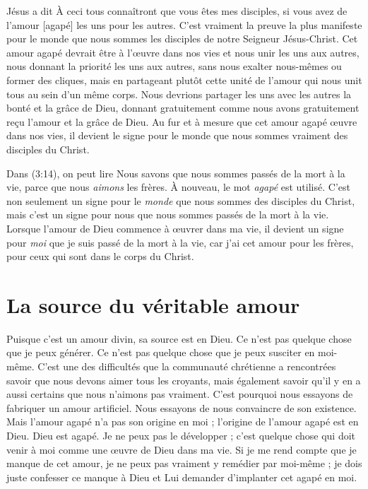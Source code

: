 Jésus a dit\frcolon{}
 \Og À ceci tous connaîtront que vous êtes mes disciples,
 si vous avez de l'amour [agapé] les uns pour les autres. \Fg{}
 C'est vraiment la preuve la plus manifeste pour le monde
 que nous sommes les disciples de notre Seigneur Jésus-Christ.
 Cet amour agapé devrait être à l'œuvre dans nos vies
 et nous unir les uns aux autres,
 nous donnant la priorité les uns aux autres,
 sans nous exalter nous-mêmes ou former des cliques,
 mais en partageant plutôt cette unité de l'amour qui
 nous unit tous au sein d'un même corps.
 Nous devrions partager les uns avec les autres la bonté et la grâce de Dieu,
 donnant gratuitement comme nous avons gratuitement reçu l'amour
 et la grâce de Dieu.
 Au fur et à mesure que cet amour agapé
 \oe{}uvre dans nos vies,
 il devient le signe pour le monde que nous sommes vraiment
 des disciples du Christ.

Dans (3:14), on peut lire\frcolon{}
 \Og Nous savons que nous sommes passés de la mort à la vie,
 parce que nous \emph{aimons} les frères. \Fg{}
 À nouveau, le mot \emph{agapé} est utilisé.
 C'est non seulement un signe pour le \emph{monde}
 que nous sommes des disciples du Christ, mais c'est un signe pour nous
 que nous sommes passés de la mort à la vie.
 Lorsque l'amour de Dieu commence à \oe{}uvrer dans ma vie,
 il devient un signe pour \emph{moi} que je suis passé de la mort à la vie,
 car j'ai cet amour pour les frères, pour ceux qui sont
 dans le corps du Christ.


\section{La source du v\'eritable amour}

Puisque c'est un amour divin, sa source est en Dieu.
 Ce n'est pas quelque chose que je peux générer.
 Ce n'est pas quelque chose que je peux susciter en moi-même.
 C'est une des difficultés que la communauté chrétienne a rencontrées\frcolon{}
 savoir que nous devons aimer tous les croyants, mais également savoir
 qu'il y en a aussi certains que nous n'aimons pas vraiment.
 C'est pourquoi nous essayons de fabriquer un amour artificiel.
 Nous essayons de nous convaincre de son existence.
 Mais l'amour agapé n'a pas son origine en moi ;
 l'origine de l'amour agapé est en Dieu. Dieu est agapé.
 Je ne peux pas le développer ; c'est quelque chose qui doit venir à moi
 comme une œuvre de Dieu dans ma vie.
 Si je me rend compte que je manque de cet amour, je ne peux pas vraiment
 y remédier par moi-même ; je dois juste confesser ce manque à Dieu
 et Lui demander d'implanter cet agapé en moi.

